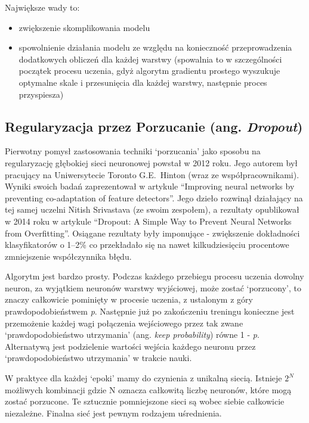 \documentclass[a4paper,12pt]{article}
\numberwithin{figure}{section}
\begin{document}
    \bigskip

    Największe wady to\cite{UczenieMaszynowe2018}:
    \begin{itemize}
        \item zwiększenie skomplikowania modelu
        \item spowolnienie działania modelu ze względu na konieczność przeprowadzenia dodatkowych obliczeń dla każdej warstwy (spowalnia to w szczególności początek procesu uczenia, gdyż algorytm gradientu prostego wyszukuje optymalne skale i przesunięcia dla każdej warstwy, następnie proces przyspiesza)
    \end{itemize}

    \subsection{Regularyzacja przez Porzucanie (ang. \textit{Dropout})}

    Pierwotny pomysł zastosowania techniki `porzucania' jako sposobu na regularyzację głębokiej sieci neuronowej powstał w 2012 roku. Jego autorem był pracujący na Uniwersytecie Toronto G.E.\ Hinton (wraz ze współpracownikami). Wyniki swoich badań zaprezentował w artykule ``Improving neural networks by preventing co-adaptation of feature detectors''\cite{ImprovingNeuralNetworks2012}. Jego dzieło rozwinął działający na tej samej uczelni Nitish Srivastava (ze swoim zespołem), a rezultaty opublikował w 2014 roku w artykule ``Dropout: A Simple Way to Prevent Neural Networks from Overfitting''\cite{Dropout2014}. Osiągane rezultaty były imponujące - zwiększenie dokładności klasyfikatorów o 1--2\% co przekładało się na nawet kilkudziesięciu procentowe zmniejszenie współczynnika błędu.

    \bigskip

    Algorytm jest bardzo prosty. Podczas każdego przebiegu procesu uczenia dowolny neuron, za wyjątkiem neuronów warstwy wyjściowej, może zostać `porzucony', to znaczy całkowicie pominięty w procesie uczenia, z ustalonym z góry prawdopodobieństwem \textit{p}. Następnie już po zakończeniu treningu konieczne jest przemożenie każdej wagi połączenia wejściowego przez tak zwane `prawdopodobieństwo utrzymania' (ang. \textit{keep probability}) równe 1 - \textit{p}. Alternatywą jest podzielenie wartości wejścia każdego neuronu przez `prawdopodobieństwo utrzymania' w trakcie nauki\cite{UczenieMaszynowe2018}.

    \bigskip

    W praktyce dla każdej `epoki' mamy do czynienia z unikalną siecią. Istnieje $2^{N}$ możliwych kombinacji gdzie N oznacza całkowitą liczbę neuronów, które mogą zostać porzucone. Te sztucznie pomniejszone sieci są wobec siebie całkowicie niezależne. Finalna sieć jest pewnym rodzajem uśrednienia\cite{UczenieMaszynowe2018}.
\end{document}
